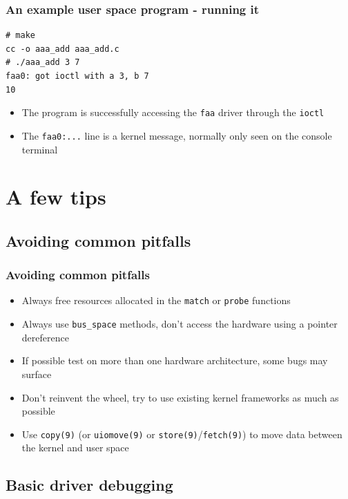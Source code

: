 \documentclass[dvipsnames,table]{beamer}
\begin{document}
\begin{frame}[fragile]
\frametitle{An example user space program - running it}
\begin{verbatim}
# make
cc -o aaa_add aaa_add.c
# ./aaa_add 3 7
faa0: got ioctl with a 3, b 7
10
\end{verbatim}
\begin{itemize}
	\item The program is successfully accessing the {\tt faa} driver through the {\tt ioctl}	
	\item The {\tt faa0:...} line is a kernel message, normally only seen on the console terminal
\end{itemize}
\end{frame}

\section{A few tips}

\subsection{Avoiding common pitfalls}

\begin{frame}
\frametitle{Avoiding common pitfalls}

\begin{itemize}
	\item Always free resources allocated in the {\tt match} or {\tt probe} functions
	\item Always use {\tt bus\_space} methods, don't access the hardware using a pointer dereference
	\item If possible test on more than one hardware architecture, some bugs may surface
	\item Don't reinvent the wheel, try to use existing kernel frameworks as much as possible
	\item Use {\tt copy(9)} (or {\tt uiomove(9)} or {\tt store(9)}/{\tt fetch(9)}) to move data between the kernel and user space
	\end{itemize}
\end{frame}

\subsection{Basic driver debugging}
\end{document}
